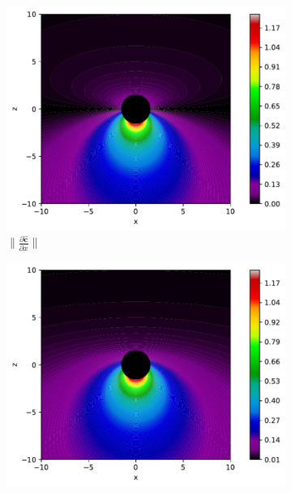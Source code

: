 \begin{figure}[H]
	\centering
	\begin{subfigure}{0.32\textwidth}
		\centering
		\includegraphics[width=\textwidth]{images/pdf/Rate_of_change_of_lights_velocity_field_with_respect_to_x.pdf}
		\caption{$\|\frac{\partial \mathbf{\hat{c}}}{\partial x}\|$}
		\label{fig: Rate of change of lights velocity field subfig_1}
	\end{subfigure}
	\begin{subfigure}{0.32\textwidth}
		\centering
		\includegraphics[width=\textwidth]{images/pdf/Rate_of_change_of_lights_velocity_field_with_respect_to_y.pdf}

\end{subfigure}
\end{figure}
